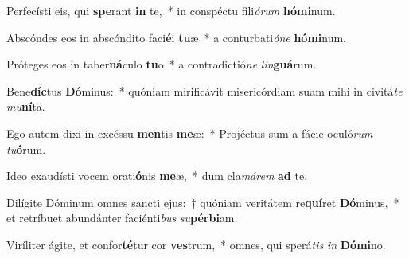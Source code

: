 \item Perfecísti eis, qui \textbf{spe}rant \textbf{in} te,~* in conspéctu fili\textit{ó}\textit{rum} \textbf{hó}\textbf{mi}num.
\item Abscóndes eos in abscóndito faci\textbf{é}i \textbf{tu}æ~* a conturbati\textit{ó}\textit{ne} \textbf{hó}\textbf{mi}num.
\item Próteges eos in taber\textbf{ná}culo \textbf{tu}o~* a contradictió\textit{ne} \textit{lin}\textbf{guá}rum.
\item Bene\textbf{díc}tus \textbf{Dó}minus:~* quóniam mirificávit misericórdiam suam mihi in civitá\textit{te} \textit{mu}\textbf{ní}ta.
\item Ego autem dixi in excéssu \textbf{men}tis \textbf{me}æ:~* Projéctus sum a fácie oculó\textit{rum} \textit{tu}\textbf{ó}rum.
\item Ideo exaudísti vocem orati\textbf{ó}nis \textbf{me}æ,~* dum cla\textit{má}\textit{rem} \textbf{ad} te.
\item Dilígite Dóminum omnes sancti ejus:~† quóniam veritátem re\textbf{quí}ret \textbf{Dó}minus,~* et retríbuet abundánter faciénti\textit{bus} \textit{su}\textbf{pér}\textbf{bi}am.
\item Viríliter ágite, et confor\textbf{té}tur cor \textbf{ves}trum,~* omnes, qui sperá\textit{tis} \textit{in} \textbf{Dó}\textbf{mi}no.
